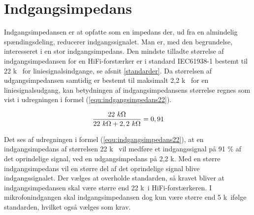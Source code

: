 \section{Indgangsimpedans}
\label{valg_indgangsimpedans}
Indgangsimpedansen er at opfatte som en impedans der, ud fra en almindelig spændingsdeling, reducerer indgangssignalet. Man er, med den begrundelse, interesseret i en stor indgangsimpedans. Den mindste tilladte størrelse af indgangsimpedansen for en HiFi-forstærker er i standard IEC61938-1 bestemt til 22 k\ohm~ for liniesignalsindgange, se afsnit \ref{standarder}. Da størrelsen af udgangsimpedansen samtidig er bestemt til maksimalt 2,2 k\ohm~ for en liniesignalsudgang, kan betydningen af indgangsimpedansens størrelse regnes som vist i udregningen i formel (\ref{equ:indgangsimpedans22}). 

\begin{equation}
\label{equ:indgangsimpedans22}
\frac{22~k\ohm}{22~k\ohm + 2,2~k\ohm} = 0,91
\end{equation}

Det ses af udregningen i formel (\ref{equ:indgangsimpedans22}), at en indgangsimpedans af størrelsen 22 k\ohm~ vil medføre et indgangssignal på 91 \% af det oprindelige signal, ved en udgangsimpedans på 2,2 k\ohm. Med en større indgangsimpedans vil en større del af det oprindelige signal blive indgangssignalet. Der vælges at overholde standarden, så kravet bliver at indgangsimpedansen skal være større end 22 k\ohm~i HiFi-forstærkeren. I mikrofonindgangen skal indgangsimpedansen dog kun være større end 5 k\ohm~ifølge standarden, hvilket også vælges som krav.

